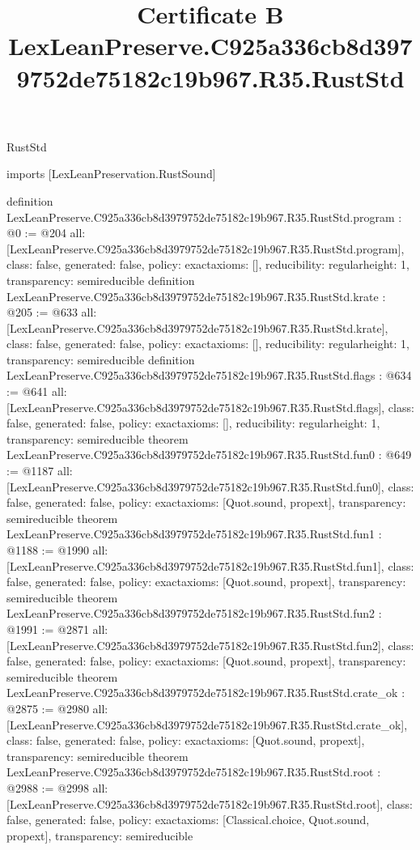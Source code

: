 \begin{lexlean}{RustStd}
\title{Certificate B LexLeanPreserve.C925a336cb8d3979752de75182c19b967.R35.RustStd}
\begin{coremodule}
imports [LexLeanPreservation.RustSound]

definition LexLeanPreserve.C925a336cb8d3979752de75182c19b967.R35.RustStd.program : @0 := @204 {
  all: [LexLeanPreserve.C925a336cb8d3979752de75182c19b967.R35.RustStd.program],
  class: false,
  generated: false,
  policy: exact{axioms: []},
  reducibility: regular{height: 1},
  transparency: semireducible
}
definition LexLeanPreserve.C925a336cb8d3979752de75182c19b967.R35.RustStd.krate : @205 := @633 {
  all: [LexLeanPreserve.C925a336cb8d3979752de75182c19b967.R35.RustStd.krate],
  class: false,
  generated: false,
  policy: exact{axioms: []},
  reducibility: regular{height: 1},
  transparency: semireducible
}
definition LexLeanPreserve.C925a336cb8d3979752de75182c19b967.R35.RustStd.flags : @634 := @641 {
  all: [LexLeanPreserve.C925a336cb8d3979752de75182c19b967.R35.RustStd.flags],
  class: false,
  generated: false,
  policy: exact{axioms: []},
  reducibility: regular{height: 1},
  transparency: semireducible
}
theorem LexLeanPreserve.C925a336cb8d3979752de75182c19b967.R35.RustStd.fun0 : @649 := @1187 {
  all: [LexLeanPreserve.C925a336cb8d3979752de75182c19b967.R35.RustStd.fun0],
  class: false,
  generated: false,
  policy: exact{axioms: [Quot.sound, propext]},
  transparency: semireducible
}
theorem LexLeanPreserve.C925a336cb8d3979752de75182c19b967.R35.RustStd.fun1 : @1188 := @1990 {
  all: [LexLeanPreserve.C925a336cb8d3979752de75182c19b967.R35.RustStd.fun1],
  class: false,
  generated: false,
  policy: exact{axioms: [Quot.sound, propext]},
  transparency: semireducible
}
theorem LexLeanPreserve.C925a336cb8d3979752de75182c19b967.R35.RustStd.fun2 : @1991 := @2871 {
  all: [LexLeanPreserve.C925a336cb8d3979752de75182c19b967.R35.RustStd.fun2],
  class: false,
  generated: false,
  policy: exact{axioms: [Quot.sound, propext]},
  transparency: semireducible
}
theorem LexLeanPreserve.C925a336cb8d3979752de75182c19b967.R35.RustStd.crate_ok : @2875 := @2980 {
  all: [LexLeanPreserve.C925a336cb8d3979752de75182c19b967.R35.RustStd.crate_ok],
  class: false,
  generated: false,
  policy: exact{axioms: [Quot.sound, propext]},
  transparency: semireducible
}
theorem LexLeanPreserve.C925a336cb8d3979752de75182c19b967.R35.RustStd.root : @2988 := @2998 {
  all: [LexLeanPreserve.C925a336cb8d3979752de75182c19b967.R35.RustStd.root],
  class: false,
  generated: false,
  policy: exact{axioms: [Classical.choice, Quot.sound, propext]},
  transparency: semireducible
}


\end{coremodule}
\end{lexlean}
